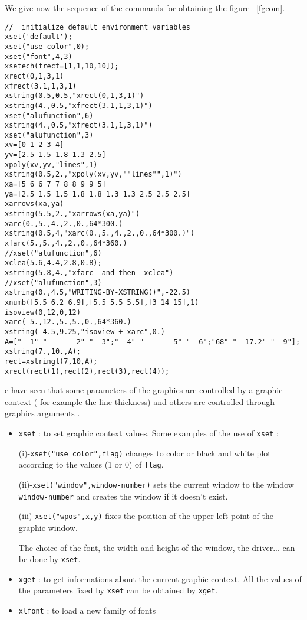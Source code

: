 We give now the sequence of the commands for obtaining the 
figure~ \ref{fgeom}.

\begin{verbatim}
//	initialize default environment variables
xset('default');
xset("use color",0);
xset("font",4,3)
xsetech(frect=[1,1,10,10]);
xrect(0,1,3,1)
xfrect(3.1,1,3,1)
xstring(0.5,0.5,"xrect(0,1,3,1)")
xstring(4.,0.5,"xfrect(3.1,1,3,1)")
xset("alufunction",6)
xstring(4.,0.5,"xfrect(3.1,1,3,1)")
xset("alufunction",3)
xv=[0 1 2 3 4]
yv=[2.5 1.5 1.8 1.3 2.5]
xpoly(xv,yv,"lines",1)
xstring(0.5,2.,"xpoly(xv,yv,""lines"",1)")
xa=[5 6 6 7 7 8 8 9 9 5]
ya=[2.5 1.5 1.5 1.8 1.8 1.3 1.3 2.5 2.5 2.5]
xarrows(xa,ya)
xstring(5.5,2.,"xarrows(xa,ya)")
xarc(0.,5.,4.,2.,0.,64*300.)
xstring(0.5,4,"xarc(0.,5.,4.,2.,0.,64*300.)")
xfarc(5.,5.,4.,2.,0.,64*360.)
//xset("alufunction",6)
xclea(5.6,4.4,2.8,0.8);
xstring(5.8,4.,"xfarc  and then  xclea")
//xset("alufunction",3)
xstring(0.,4.5,"WRITING-BY-XSTRING()",-22.5) 
xnumb([5.5 6.2 6.9],[5.5 5.5 5.5],[3 14 15],1)
isoview(0,12,0,12)
xarc(-5.,12.,5.,5.,0.,64*360.)
xstring(-4.5,9.25,"isoview + xarc",0.)
A=["  1" "       2" "  3";"  4" "       5" "  6";"68" "  17.2" "  9"];
xstring(7.,10.,A);
rect=xstringl(7,10,A);
xrect(rect(1),rect(2),rect(3),rect(4));
\end{verbatim}




e have seen that some parameters of the graphics are controlled by a 
graphic context 
( for example the line thickness) and others are controlled through
graphics arguments . 
%
\begin{itemize}
	\item  {\tt xset}	: to set graphic context values.
Some examples of the use of {\tt xset} : 

(i)-{\tt xset("use color",flag)} changes to color or black and white plot according to 
the values (1 or 0) of {\tt flag}.

(ii)-{\tt xset("window",window-number)} sets the current window to the window \\
{\tt window-number} and creates the window if it doesn't exist.

(iii)-{\tt xset("wpos",x,y)} fixes the position of the upper left point of 
the graphic window.

The choice of the font, the width and height of the window, the driver...
can be done by {\tt xset}.

	\item  {\tt xget}	: to get informations about the current graphic context.
All the values of the parameters fixed by {\tt xset} can be obtained by 
{\tt xget}.

        \item  {\tt xlfont}	: to load a new family of fonts
\end{itemize}
%

